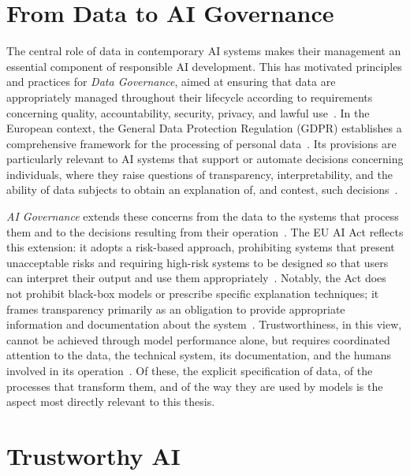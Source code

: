 \section{From Data to AI Governance}

The central role of data in contemporary AI systems makes their management an essential component of responsible AI development. This has motivated principles and practices for \emph{Data Governance}, aimed at ensuring that data are appropriately managed throughout their lifecycle according to requirements concerning quality, accountability, security, privacy, and lawful use~\cite{hamon_robustness_2020}. In the European context, the General Data Protection Regulation (GDPR) establishes a comprehensive framework for the processing of personal data~\cite{data_protection_working_party_article29_nodate}. Its provisions are particularly relevant to AI systems that support or automate decisions concerning individuals, where they raise questions of transparency, interpretability, and the ability of data subjects to obtain an explanation of, and contest, such decisions~\cite{panigutti_role_2023,kaminski_right_2019}.

\emph{AI Governance} extends these concerns from the data to the systems that process them and to the decisions resulting from their operation~\cite{hamon_robustness_2020}. The EU AI Act reflects this extension: it adopts a risk-based approach, prohibiting systems that present unacceptable risks and requiring high-risk systems to be designed so that users can interpret their output and use them appropriately~\cite{oecd_collective_2024,corbucci_semantic_2023}. Notably, the Act does not prohibit black-box models or prescribe specific explanation techniques; it frames transparency primarily as an obligation to provide appropriate information and documentation about the system~\cite{panigutti_role_2023,panigutti_co-design_2023}. Trustworthiness, in this view, cannot be achieved through model performance alone, but requires coordinated attention to the data, the technical system, its documentation, and the humans involved in its operation~\cite{panigutti_role_2023,oecd_collective_2024}. Of these, the explicit specification of data, of the processes that transform them, and of the way they are used by models is the aspect most directly relevant to this thesis.

\section{Trustworthy AI}\label{sec:trustworthy-ai}

